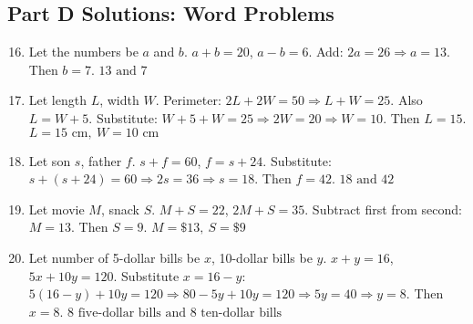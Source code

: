 \documentclass[12pt]{article}
\begin{document}
\subsection*{Part D Solutions: Word Problems}
\begin{enumerate}
  \setcounter{enumi}{15}
  \item Let the numbers be \(a\) and \(b\).  
  \(a + b = 20\), \(a - b = 6\). Add: \(2a = 26 \Rightarrow a = 13\). Then \(b = 7\).  
  \(\boxed{13 \text{ and } 7}\)

  \item Let length \(L\), width \(W\).  
  Perimeter: \(2L + 2W = 50 \Rightarrow L + W = 25\). Also \(L = W + 5\).  
  Substitute: \(W + 5 + W = 25 \Rightarrow 2W = 20 \Rightarrow W = 10\). Then \(L = 15\).  
  \(\boxed{L = 15 \text{ cm},\ W = 10 \text{ cm}}\)

  \item Let son \(s\), father \(f\).  
  \(s + f = 60\), \(f = s + 24\). Substitute: \(s + (s + 24) = 60 \Rightarrow 2s = 36 \Rightarrow s = 18\). Then \(f = 42\).  
  \(\boxed{18 \text{ and } 42}\)

  \item Let movie \(M\), snack \(S\).  
  \(M + S = 22\), \(2M + S = 35\). Subtract first from second: \(M = 13\). Then \(S = 9\).  
  \(\boxed{M = \$13,\ S = \$9}\)

  \item Let number of 5-dollar bills be \(x\), 10-dollar bills be \(y\).  
  \(x + y = 16\), \(5x + 10y = 120\). Substitute \(x = 16 - y\):  
  \(5(16 - y) + 10y = 120 \Rightarrow 80 - 5y + 10y = 120 \Rightarrow 5y = 40 \Rightarrow y = 8\).  
  Then \(x = 8\).  
  \(\boxed{8 \text{ five-dollar bills and } 8 \text{ ten-dollar bills}}\)
\end{enumerate}
\end{document}
